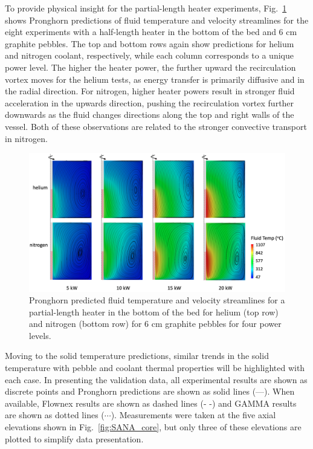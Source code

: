 To provide physical insight for the partial-length heater experiments, Fig.\ \ref{fig:streamlines1} shows Pronghorn predictions of fluid temperature and velocity streamlines for the eight experiments with a half-length heater in the bottom of the bed and 6 \si{\centi\meter} graphite pebbles. The top and bottom rows again show predictions for helium and nitrogen coolant, respectively, while each column corresponds to a unique power level. The higher the heater power, the further upward the recirculation vortex moves for the helium tests, as energy transfer is primarily diffusive and in the radial direction. For nitrogen, higher heater powers result in stronger fluid acceleration in the upwards direction, pushing the recirculation vortex further downwards as the fluid changes directions along the top and right walls of the vessel. Both of these observations are related to the stronger convective transport in nitrogen.

\begin{figure}[h!]
\centering
\centerline{
\includegraphics[height=0.6\linewidth]{figs/sana_bottom_vel.png}}
\caption{Pronghorn predicted fluid temperature and velocity streamlines for a partial-length heater in the bottom of the bed for helium (top row) and nitrogen (bottom row) for 6 \si{\centi\meter} graphite pebbles for four power levels.}
\label{fig:streamlines1}
\end{figure}

Moving to the solid temperature predictions, similar trends in the solid temperature with pebble and coolant thermal properties will be highlighted with each case. In presenting the validation data, all experimental results are shown as discrete points and Pronghorn predictions are shown as solid lines (---). When available, Flownex results are shown as dashed lines (- -) and GAMMA results are shown as dotted lines ($\cdots$). Measurements were taken at the five axial elevations shown in Fig.\ \ref{fig:SANA_core}, but only three of these elevations are plotted to simplify data presentation.

